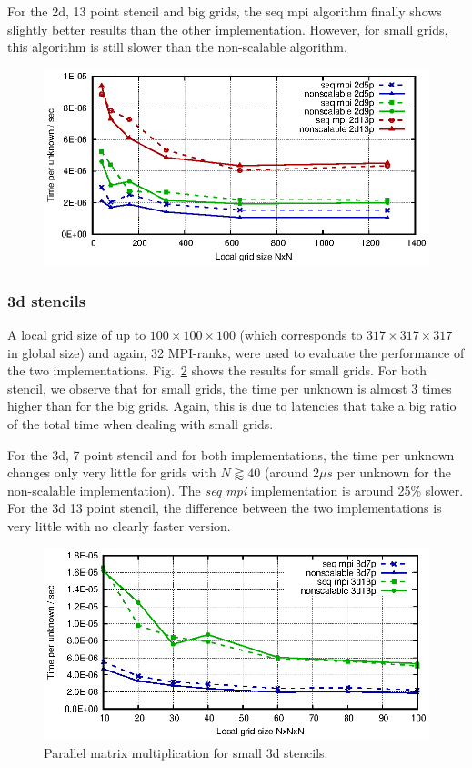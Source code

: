 For the 2d, 13 point stencil and big grids, the seq mpi algorithm finally shows slightly better results than the other implementation. However, for small grids, this algorithm is still slower than the non-scalable algorithm. 

\begin{figure}[tbp]
	\centering
	\includegraphics[width=1\textwidth]{times_2d}
	\caption{} 
	\label{fig:mat_ex_test_ex2_times_2d}
\end{figure}

\subsubsection*{3d stencils}
A local grid size of up to $100 \times 100 \times 100$ (which corresponds to $317 \times 317 \times 317$ in global size) and again, 32 MPI-ranks, were used to evaluate the performance of the two implementations.  Fig.~\ref{fig:mat_ex_test_ex2_times_3dsmall} shows the results for small grids. For both stencil, we observe that for small grids, the time per unknown is almost 3 times higher than for the big grids. Again, this is due to latencies that take a big ratio of the total time when dealing with small grids.

For the 3d, 7 point stencil and for both implementations, the time per unknown changes only very little for grids with $N \gtrapprox 40$ (around 2$\mu  s$ per unknown for the non-scalable implementation). The \textit{seq mpi} implementation is around 25\% slower. For the 3d 13 point stencil, the difference between the two implementations is very little with no clearly faster version. 


\begin{figure}[tbp]
	\centering
	\vspace*{-2.5mm}\includegraphics[width=1\textwidth]{times_3dsmall}
	\caption{Parallel matrix multiplication for small 3d stencils. } 
	\label{fig:mat_ex_test_ex2_times_3dsmall}
\end{figure}

